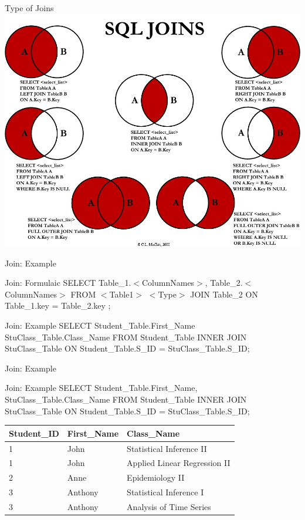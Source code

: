 \documentclass[handout]{beamer}
\begin{document}
\begin{frame}{Type of Joins}
	\centering
	\includegraphics[width = .78 \textwidth]{Visual_SQL_JOINS_orig.jpg}
\end{frame}



	\begin{frame}{Join: Example}
		\begin{block}{Join: Formulaic}
			SELECT Table\_1.$<$ColumnNames$>$, Table\_2.$<$ColumnNames$>$ FROM $<$Table1$>$ $<$Type$>$ JOIN Table\_2 ON Table\_1.key = Table\_2.key ;
		\end{block}
		\begin{block}{Join: Example}
			SELECT Student\_Table.First\_Name StuClass\_Table.Class\_Name FROM Student\_Table INNER JOIN StuClass\_Table ON Student\_Table.S\_ID = StuClass\_Table.S\_ID;
		\end{block}	
	\end{frame}
	
	\begin{frame}{Join: Example}
			\begin{block}{Join: Example}
				SELECT Student\_Table.First\_Name, StuClass\_Table.Class\_Name FROM Student\_Table INNER JOIN StuClass\_Table ON Student\_Table.S\_ID = StuClass\_Table.S\_ID;
			\end{block}		
		\begin{table}[H]
			\centering
			\begin{tabular}{|l|l|l|}
				\hline
				Student\_ID & First\_Name & Class\_Name \\ \hline
				1 & John & Statistical Inference II \\ \hline
				1 & John & Applied Linear Regression II \\ \hline
				2 & Anne & Epidemiology II \\ \hline
				3 & Anthony & Statistical Inference I \\ \hline
				3 & Anthony & Analysis of Time Series \\ \hline
			\end{tabular}
		\end{table}
	\end{frame}
	
\end{document}

